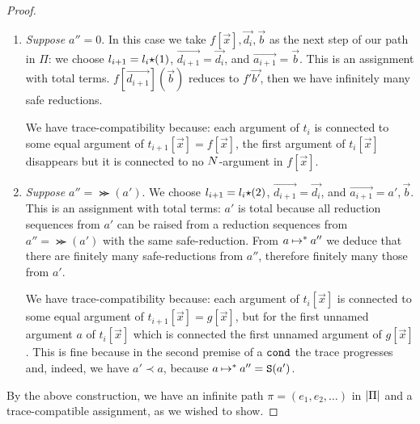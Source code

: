 \begin{proof}
\begin{enumerate}
\begin{enumerate}

\begin{enumerate}
\item
  \emph{Suppose $a'' = 0$}.
   In this case we take $f[\vec{x}],\vec{d_i},\vec{b}$ as the next step of our path in $\Pi$:
  we choose $l_{i+1} = l_i {\star} (1)$, $\vec{d_{i+1}} = \vec{d_i}$, 
  and $\vec{a_{i+1}} = \vec{b}$. 
  This is an assignment with total terms.
  $f[\vec{d_{i+1}}](\vec{b})$ reduces to $f' \vec{b'}$, 
  then we have infinitely many safe reductions.

  We have trace-compatibility because: 
  each argument of $t_i$ is connected to some equal argument of
  $t_{i+1}[\vec{x}]=f[\vec{x}]$,
  the first argument of $t_i[\vec{x}]$ disappears   
  but it is connected to no ${N}$-argument in $f[\vec{x}]$.

 \item
  \emph{Suppose $a'' = \Succ(a')$}. 
  We choose $l_{i+1} = l_i {\star} (2)$, $\vec{d_{i+1}} = \vec{d_i}$, and
  $\vec{a_{i+1}} = a',\vec{b}$. This is an assignment with total terms: $a'$ is total because
  all reduction sequences from $a'$ can be raised from a reduction sequences from 
  $a'' = \Succ(a')$ with the same safe-reduction. From $a \mathbin{\mapsto}^{*} a''$ we deduce that
  there are finitely many safe-reductions from $a''$, therefore finitely many those from $a'$.
 
  We have trace-compatibility because: each argument of $t_i[\vec{x}]$ is connected 
  to some equal argument of $t_{i+1}[\vec{x}]=g[\vec{x}]$,
  but for the first unnamed argument $a$ of $t_i[\vec{x}]$ 
  which is connected the first unnamed argument of $g[\vec{x}]$.
  This is fine because in the second premise of a ${\tt cond}$ 
  the trace progresses and, indeed, we have $a' \prec a$, 
  because $a \mathbin{\mapsto}^{*}  a'' = {\tt S}(a')$.

  \end{enumerate}
 \end{enumerate}
\end{enumerate}

By the above construction, we have an infinite path $\pi = (e_1,e_2,\ldots)$ in ${|\Pi|}$
and a trace-compatible assignment, as we wished to show.

\end{proof}



%


